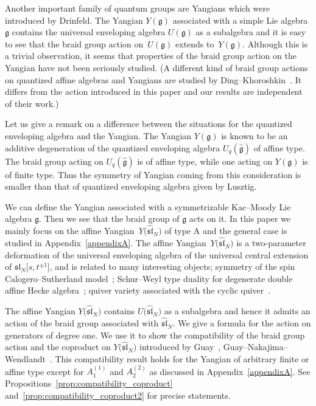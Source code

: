 \documentclass[pdftex]{sigma}
\theoremstyle{definition}
\numberwithin{equation}{section}
\newcommand{\affY}{Y\big(\affsl\big)}
\newcommand{\frakg}{\mathfrak{g}}
\newcommand{\affsl}{\hat{\mathfrak{sl}}_N}
\begin{document}
 Another important family of quantum groups are Yangians which were introduced by Drinfeld. The Yangian $Y(\frakg)$ associated with a simple Lie algebra $\frakg$ contains the universal enveloping algebra $U(\frakg)$ as a subalgebra and it is easy to see that the braid group action on~$U(\frakg)$ extends to~$Y(\frakg)$. Although this is a trivial observation, it seems that properties of the braid group action on the Yangian have not been seriously studied. (A different kind of braid group actions on quantized affine algebras and Yangians are studied by Ding--Khoroshkin~\cite{MR1745710}. It differs from the action introduced in this paper and our results are independent of their work.)

 Let us give a remark on a difference between the situations for the quantized enveloping algebra and the Yangian. The Yangian $Y(\frakg)$ is known to be an additive degeneration of the quantized enveloping algebra $U_q(\hat{\frakg})$ of affine type. The braid group acting on $U_q(\hat{\frakg})$ is of affine type, while one acting on $Y(\frakg)$ is of finite type. Thus the symmetry of Yangian coming from this consideration is smaller than that of quantized enveloping algebra given by Lusztig.

We can define the Yangian associated with a symmetrizable Kac--Moody Lie algebra $\frakg$. Then we see that the braid group of $\frakg$ acts on it. In this paper we mainly focus on the affine Yangian~$\affY$ of type A and the general case is studied in Appendix~\ref{appendixA}. The affine Yangian~$\affY$ is a two-parameter deformation of the universal enveloping algebra of the universal central extension of $\mathfrak{sl}_N\big[s,t^{\pm 1}\big]$, and is related to many interesting objects; symmetry of the spin Calogero--Sutherland model~\cite{MR3898327, MR1724950}; Schur--Weyl type duality for degenerate double affine Hecke algebra~\cite{MR2199856}; quiver variety associated with the cyclic quiver~\cite{MR3898327, MR1818101}.

The affine Yangian $\affY$ contains $U\big(\affsl\big)$ as a subalgebra and hence it admits an action of the braid group associated with $\affsl$. We give a formula for the action on generators of degree one. We use it to show the compatibility of the braid group action and the coproduct on $\affY$ introduced by Guay~\cite{MR2323534}, Guay--Nakajima--Wendlandt~\cite{MR3861718}. This compatibility result holds for the Yangian of arbitrary finite or affine type except for $A_1^{(1)}$ and $A_2^{(2)}$ as discussed in Appendix~\ref{appendixA}. See Propositions~\ref{prop:compatibility_coproduct} and~\ref{prop:compatibility_coproduct2} for precise statements.
\end{document}
